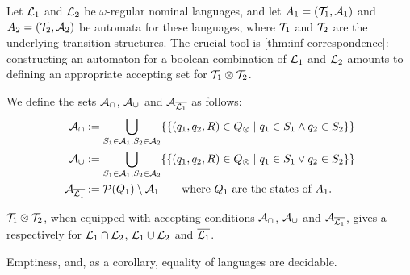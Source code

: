 \newcommand{\compl}[1]{\overline{#1}}
 

Let $\mathcal{L}_1$ and $\mathcal{L}_2$ be $\omega$-regular nominal languages, and let $A_1 = (\mathcal{T}_1,\mathcal{A}_1)$  and $A_2 = (\mathcal{T}_2,\mathcal{A}_2)$ be automata for these languages, where $\mathcal{T}_1$ and $\mathcal{T}_2$ are the underlying transition structures.
The crucial tool is \cref{thm:inf-correspondence}: constructing an automaton for a boolean combination of $\mathcal{L}_1$ and $\mathcal{L}_2$ amounts to defining an appropriate accepting set for $\mathcal{T}_1 \otimes \mathcal{T}_2$.

\begin{definition} We define the sets $\mathcal{A}_\cap$, $\mathcal{A}_\cup$ and $\acc_{\compl{\Lang_1}}$ as follows:
%
\begin{align*}
	\acc_\cap &:= \bigcup_{S_1 \in \acc_1,S_2 \in \acc_2 } \{\{ (q_1,q_2,R) \in \syncQ \mid q_1 \in S_1 \land q_2 \in S_2 \}\} 
	\\
	\acc_\cup &:= \bigcup_{S_1 \in \acc_1,S_2 \in \acc_2 } \{\{(q_1,q_2,R) \in \syncQ \mid q_1 \in S_1 \lor q_2 \in S_2 \}\} 
	\\
	\acc_{\compl{\Lang_1}} &:= \Pow(Q_1) \setminus \acc_1 \qquad \text{where $Q_1$ are the states of $\autom_1$.}
\end{align*}
%
%
\end{definition}

\begin{theorem}
$\mathcal{T}_1 \otimes \mathcal{T}_2$, when equipped with accepting conditions $\mathcal{A}_\cap$, $\mathcal{A}_\cup$ and $\acc_{\compl{\Lang_1}}$, gives a \hdma{} respectively for $\mathcal{L}_1 \cap \mathcal{L}_2$, $\mathcal{L}_1 \cup \mathcal{L}_2$ and $\compl{\Lang_1}$.
\label{thm:bool-closure}
\end{theorem}
%
\begin{theorem}
\label{thm:decidable}
Emptiness, and, as a corollary, equality of languages are decidable.
\end{theorem}
